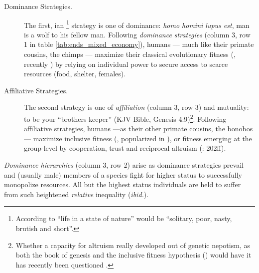 \begin{description}
	\item[Dominance Strategies.] The first, \citeauthor{Hobbes-1651-aa}ian \citeyearpar{Hobbes-1651-aa}\footnote{
		According to \cite{Hobbes-1651-aa} ``life in a state of nature'' would be ``solitary, poor, nasty, brutish and short''.} 
	strategy is one of dominance: \emph{homo homini lupus est}, man is a wolf to his fellow man. Following \emph{dominance strategies} (column 3, row 1 in table \ref{tab:ends_mixed_economy}), humans --- much like their primate cousins, the chimps --- maximize their classical evolutionary fitness (\citealt{Darwin1859}, recently \citealt{Dawkins1976}) by relying on individual power to secure access to scarce resources (food, shelter, females).
	
	\item[Affiliative Strategies.] The second strategy is one of \emph{affiliation} (column 3, row 3) and mutuality: to be your ``brothers keeper'' (\gls{KJV} Bible, Genesis 4:9)\footnote{
		Whether a capacity for altruism really developed out of genetic nepotism, as both the book of genesis and the inclusive fitness hypothesis (\citealt{Hamilton1964,Wilson1975}) would have it has recently been questioned \citep{Wilson2012}.}. Following affiliative strategies, humans ---as their other primate cousins, the bonobos --- maximize inclusive fitness (\citealt{Hamilton1964}, popularized in \citealt{Wilson1975}), or fitness emerging at the group-level \citep{Wilson2012} by cooperation, trust and reciprocal altruism (\citealt{Pickett-2009-kx}: 202ff). 
\end{description}

\emph{Dominance hierarchies} (column 3, row 2) arise as dominance strategies prevail and (usually male) members of a species fight for higher status to successfully monopolize resources.  All but the highest status individuals are held to suffer from such heightened \emph{relative} inequality (\emph{ibid.}).

